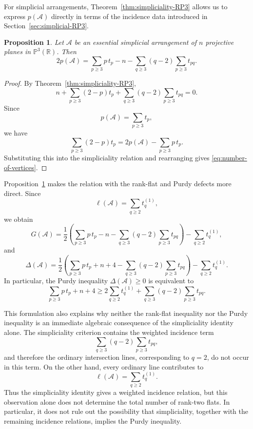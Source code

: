 \documentclass[11pt]{article}
\newtheorem{proposition}[theorem]{Proposition}
\theoremstyle{definition}
\theoremstyle{remark}
\newcommand{\PP}{\mathbb P}
\newcommand{\RR}{\mathbb R}
\newcommand{\cA}{\mathcal A}
\begin{document}
For simplicial arrangements, Theorem~\ref{thm:simpliciality-RP3}
allows us to express $p(\cA)$ directly in terms of the incidence data introduced in
Section~\ref{sec:simplicial-RP3}.

\begin{proposition}
\label{prop:number-of-vertices}
Let $\cA$ be an essential simplicial arrangement of $n$ projective
planes in $\PP^3(\RR)$. Then
\begin{equation}
\label{eq:number-of-vertices}
2p(\cA)
=
\sum_{p\geq3}p\,t_p
-
n
-
\sum_{q\geq3}(q-2)
\sum_{p\geq3}t_{pq}.
\end{equation}
\end{proposition}

\begin{proof}
By Theorem~\ref{thm:simpliciality-RP3},
\[
n
+
\sum_{p\geq3}(2-p)t_p
+
\sum_{q\geq3}(q-2)
\sum_{p\geq3}t_{pq}
=0.
\]
Since
\[
p(\cA)=\sum_{p\geq3}t_p,
\]
we have
\[
\sum_{p\geq3}(2-p)t_p
=
2p(\cA)-\sum_{p\geq3}p\,t_p.
\]
Substituting this into the simpliciality relation and rearranging gives
\eqref{eq:number-of-vertices}.
\end{proof}

Proposition~\ref{prop:number-of-vertices} makes the relation with the
rank-flat and Purdy defects more direct. Since
\[
\ell(\cA)=\sum_{q\geq2}t_q^{(1)},
\]
we obtain
\[
G(\cA)
=
\frac{1}{2}
\left(
\sum_{p\geq3}p\,t_p
-
n
-
\sum_{q\geq3}(q-2)\sum_{p\geq3}t_{pq}
\right)
-
\sum_{q\geq2}t_q^{(1)},
\]
and
\[
\Delta(\cA)
=
\frac{1}{2}
\left(
\sum_{p\geq3}p\,t_p
+
n+4
-
\sum_{q\geq3}(q-2)\sum_{p\geq3}t_{pq}
\right)
-
\sum_{q\geq2}t_q^{(1)}.
\]
In particular, the Purdy inequality $\Delta(\cA)\geq0$ is equivalent
to
\begin{equation}
\label{eq:purdy-GS-data}
\sum_{p\geq3}p\,t_p+n+4
\geq
2\sum_{q\geq2}t_q^{(1)}
+
\sum_{q\geq3}(q-2)\sum_{p\geq3}t_{pq}.
\end{equation}

This formulation also explains why neither the rank-flat inequality nor
the Purdy inequality is an immediate algebraic consequence of the
simpliciality identity alone.  The simpliciality criterion contains the
weighted incidence term
\[
\sum_{q\geq3}(q-2)\sum_{p\geq3}t_{pq},
\]
and therefore the ordinary intersection lines, corresponding to
$q=2$, do not occur in this term.  On the other hand, every ordinary
line contributes to
\[
\ell(\cA)=\sum_{q\geq2}t_q^{(1)}.
\]
Thus the simpliciality identity gives a weighted incidence relation, but
this observation alone does not determine the total number of rank-two
flats.  In particular, it does not rule out the possibility that
simpliciality, together with the remaining incidence relations, implies
the Purdy inequality.
\end{document}
